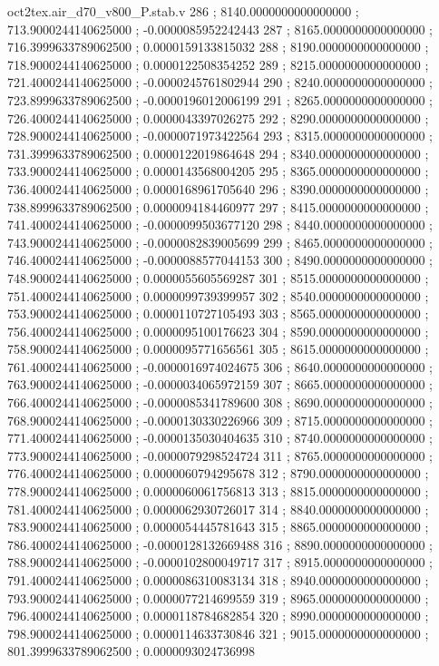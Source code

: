\begin{filecontents}[overwrite]{oct2tex.air_d70_v800_P.stab.v}
286 ; 8140.0000000000000000 ; 713.9000244140625000 ; -0.0000085952242443
287 ; 8165.0000000000000000 ; 716.3999633789062500 ; 0.0000159133815032
288 ; 8190.0000000000000000 ; 718.9000244140625000 ; 0.0000122508354252
289 ; 8215.0000000000000000 ; 721.4000244140625000 ; -0.0000245761802944
290 ; 8240.0000000000000000 ; 723.8999633789062500 ; -0.0000196012006199
291 ; 8265.0000000000000000 ; 726.4000244140625000 ; 0.0000043397026275
292 ; 8290.0000000000000000 ; 728.9000244140625000 ; -0.0000071973422564
293 ; 8315.0000000000000000 ; 731.3999633789062500 ; 0.0000122019864648
294 ; 8340.0000000000000000 ; 733.9000244140625000 ; 0.0000143568004205
295 ; 8365.0000000000000000 ; 736.4000244140625000 ; 0.0000168961705640
296 ; 8390.0000000000000000 ; 738.8999633789062500 ; 0.0000094184460977
297 ; 8415.0000000000000000 ; 741.4000244140625000 ; -0.0000099503677120
298 ; 8440.0000000000000000 ; 743.9000244140625000 ; -0.0000082839005699
299 ; 8465.0000000000000000 ; 746.4000244140625000 ; -0.0000088577044153
300 ; 8490.0000000000000000 ; 748.9000244140625000 ; 0.0000055605569287
301 ; 8515.0000000000000000 ; 751.4000244140625000 ; 0.0000099739399957
302 ; 8540.0000000000000000 ; 753.9000244140625000 ; 0.0000110727105493
303 ; 8565.0000000000000000 ; 756.4000244140625000 ; 0.0000095100176623
304 ; 8590.0000000000000000 ; 758.9000244140625000 ; 0.0000095771656561
305 ; 8615.0000000000000000 ; 761.4000244140625000 ; -0.0000016974024675
306 ; 8640.0000000000000000 ; 763.9000244140625000 ; -0.0000034065972159
307 ; 8665.0000000000000000 ; 766.4000244140625000 ; -0.0000085341789600
308 ; 8690.0000000000000000 ; 768.9000244140625000 ; -0.0000130330226966
309 ; 8715.0000000000000000 ; 771.4000244140625000 ; -0.0000135030404635
310 ; 8740.0000000000000000 ; 773.9000244140625000 ; -0.0000079298524724
311 ; 8765.0000000000000000 ; 776.4000244140625000 ; 0.0000060794295678
312 ; 8790.0000000000000000 ; 778.9000244140625000 ; 0.0000060061756813
313 ; 8815.0000000000000000 ; 781.4000244140625000 ; 0.0000062930726017
314 ; 8840.0000000000000000 ; 783.9000244140625000 ; 0.0000054445781643
315 ; 8865.0000000000000000 ; 786.4000244140625000 ; -0.0000128132669488
316 ; 8890.0000000000000000 ; 788.9000244140625000 ; -0.0000102800049717
317 ; 8915.0000000000000000 ; 791.4000244140625000 ; 0.0000086310083134
318 ; 8940.0000000000000000 ; 793.9000244140625000 ; 0.0000077214699559
319 ; 8965.0000000000000000 ; 796.4000244140625000 ; 0.0000118784682854
320 ; 8990.0000000000000000 ; 798.9000244140625000 ; 0.0000114633730846
321 ; 9015.0000000000000000 ; 801.3999633789062500 ; 0.0000093024736998

\end{filecontents}
